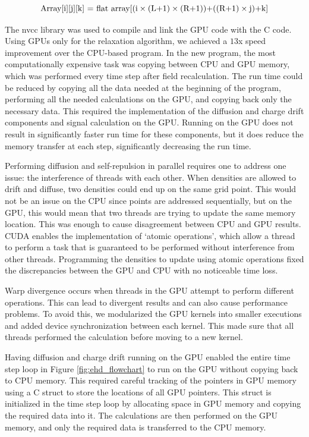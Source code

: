 \begin{equation}{\label{flat_array}}
 \text{Array[i][j][k] = flat array[(i} \times \text{(L+1)}\times \text{(R+1))+((R+1)}\times \text{j)+k]}
\end{equation}

The nvcc library was used to compile and link the GPU {\cpp} code with the {\ehd} C code. Using GPUs only for the relaxation algorithm, we achieved a $13$x speed improvement over the CPU-based program. In the new program, the most computationally expensive task was copying between CPU and GPU memory, which was performed every time step after field recalculation. The run time could be reduced by copying all the data needed at the beginning of the program, performing all the needed calculations on the GPU, and copying back only the necessary data. This required the implementation of the diffusion and charge drift components and signal calculation on the GPU. Running on the GPU does not result in significantly faster run time for these components, but it does reduce the memory transfer at each step, significantly decreasing the run time.

Performing diffusion and self-repulsion in parallel requires one to address one issue: the interference of threads with each other. When densities are allowed to drift and diffuse, two densities could end up on the same grid point. This would not be an issue on the CPU since points are addressed sequentially, but on the GPU, this would mean that two threads are trying to update the same memory location. This was enough to cause disagreement between CPU and GPU results. CUDA enables the implementation of `atomic operations', which allow a thread to perform a task that is guaranteed to be performed without interference from other threads. Programming the densities to update using atomic operations fixed the discrepancies between the GPU and CPU with no noticeable time loss.

Warp divergence occurs when threads in the GPU attempt to perform different operations. This can lead to divergent results and can also cause performance problems. To avoid this, we modularized the GPU kernels into smaller executions and added device synchronization between each kernel. This made sure that all threads performed the calculation before moving to a new kernel.

Having diffusion and charge drift running on the GPU enabled the entire time step loop in Figure \ref{fig:ehd_flowchart} to run on the GPU without copying back to CPU memory. This required careful tracking of the pointers in GPU memory using a C struct to store the locations of all GPU pointers. This struct is initialized in the time step loop by allocating space in GPU memory and copying the required data into it. The calculations are then performed on the GPU memory, and only the required data is transferred to the CPU memory.

